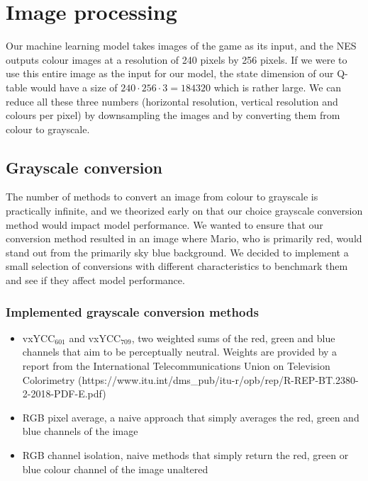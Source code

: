 \section{Image processing}

Our machine learning model takes images of the game as its input, and the NES outputs colour images at a resolution of 240 pixels by 256 pixels. If we were to use this entire image as the input for our model, the state dimension of our Q-table would have a size of $240 \cdot 256 \cdot 3 = 184320$ which is rather large. We can reduce all these three numbers (horizontal resolution, vertical resolution and colours per pixel) by downsampling the images and by converting them from colour to grayscale.

\subsection{Grayscale conversion}

The number of methods to convert an image from colour to grayscale is practically infinite, and we theorized early on that our choice grayscale conversion method would impact model performance. We wanted to ensure that our conversion method resulted in an image where Mario, who is primarily red, would stand out from the primarily sky blue background. We decided to implement a small selection of conversions with different characteristics to benchmark them and see if they affect model performance.

\subsubsection*{Implemented grayscale conversion methods}

\begin{itemize}
    \item vxYCC$_{601}$ and vxYCC$_{709}$, two weighted sums of the red, green and blue channels that aim to be perceptually neutral. Weights are provided by a report from the International Telecommunications Union on Television Colorimetry (https://www.itu.int/dms\_pub/itu-r/opb/rep/R-REP-BT.2380-2-2018-PDF-E.pdf)
    \item RGB pixel average, a naive approach that simply averages the red, green and blue channels of the image
    \item RGB channel isolation, naive methods that simply return the red, green or blue colour channel of the image unaltered
\end{itemize}

